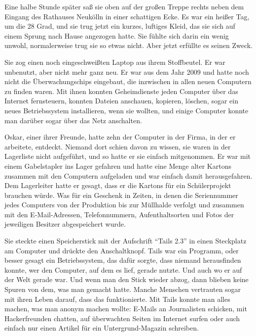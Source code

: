Eine halbe Stunde später saß sie oben auf der großen Treppe rechts neben dem Eingang des Rathauses Neukölln in einer schattigen Ecke.
Es war ein heißer Tag, um die 28 Grad, und sie trug jetzt ein kurzes, luftiges Kleid, das sie sich auf einem Sprung nach Hause angezogen hatte.
Sie fühlte sich darin ein wenig unwohl, normalerweise trug sie so etwas nicht.
Aber jetzt erfüllte es seinen Zweck.

Sie zog einen noch eingeschweißten Laptop aus ihrem Stoffbeutel.
Er war unbenutzt, aber nicht mehr ganz neu.
Er war aus dem Jahr 2009 und hatte noch nicht die Überwachungschips eingebaut, die inzwischen in allen neuen Computern zu finden waren.
Mit ihnen konnten Geheimdienste jeden Computer über das Internet fernsteuern, konnten Dateien anschauen, kopieren, löschen, sogar ein neues Betriebssystem installieren, wenn sie wollten, und einige Computer konnte man darüber sogar über das Netz anschalten.


Oskar, einer ihrer Freunde, hatte zehn der Computer in der Firma, in der er arbeitete, entdeckt.
Niemand dort schien davon zu wissen, sie waren in der Lagerliste nicht aufgeführt, und so hatte er sie einfach mitgenommen.
Er war mit einem Gabelstapler ins Lager gefahren und hatte eine Menge alter Kartons zusammen mit den Computern aufgeladen und war einfach damit herausgefahren.
Dem Lagerleiter hatte er gesagt, dass er die Kartons für ein Schülerprojekt brauchen würde.
Was für ein Geschenk in Zeiten, in denen die Seriennummer jedes Computers von der Produktion bis zur Müllhalde verfolgt und zusammen mit den E-Mail-Adressen, Telefonnummern, Aufenthaltsorten und Fotos der jeweiligen Besitzer abgespeichert wurde.

Sie steckte einen Speicherstick mit der Aufschrift \enquote{Tails 2.3} in einen Steckplatz am Computer und drückte den Anschaltknopf.
Tails war ein Programm, oder besser gesagt ein Betriebssystem, das dafür sorgte, dass niemand herausfinden konnte, wer den Computer, auf dem es lief, gerade nutzte.
Und auch wo er auf der Welt gerade war.
Und wenn man den Stick wieder abzog, dann blieben keine Spuren von dem, was man gemacht hatte.
Manche Menschen vertrauten sogar mit ihren Leben darauf, dass das funktionierte.
Mit Tails konnte man alles machen, was man anonym machen wollte: E-Mails an Journalisten schicken, mit Hackerfreunden chatten, auf überwachten Seiten im Internet surfen oder auch einfach nur einen Artikel für ein Untergrund-Magazin schreiben.

